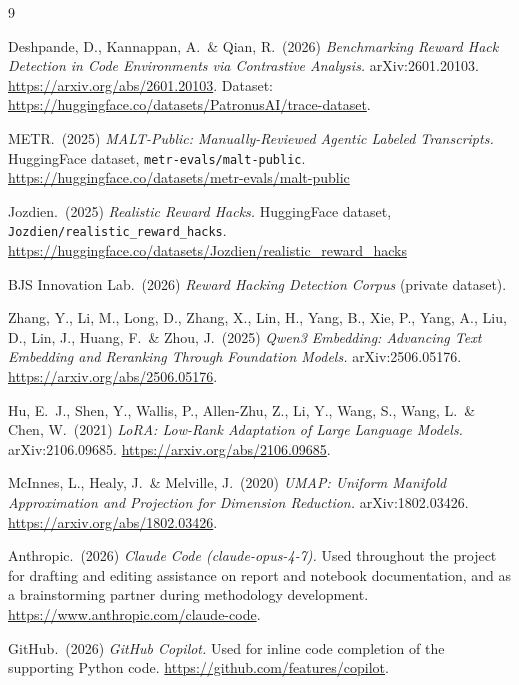\documentclass{article}
\begin{document}
\begin{thebibliography}{9}

Deshpande, D., Kannappan, A.\ \& Qian, R.\ (2026) {\it Benchmarking Reward Hack Detection in Code Environments via Contrastive Analysis.} arXiv:2601.20103. \url{https://arxiv.org/abs/2601.20103}. Dataset: \url{https://huggingface.co/datasets/PatronusAI/trace-dataset}.

METR.\ (2025) {\it MALT-Public: Manually-Reviewed Agentic Labeled Transcripts.} HuggingFace dataset, \texttt{metr-evals/malt-public}. \url{https://huggingface.co/datasets/metr-evals/malt-public}

Jozdien.\ (2025) {\it Realistic Reward Hacks.} HuggingFace dataset, \texttt{Jozdien/realistic\_reward\_hacks}. \url{https://huggingface.co/datasets/Jozdien/realistic_reward_hacks}

BJS Innovation Lab.\ (2026) {\it Reward Hacking Detection Corpus} (private dataset).

Zhang, Y., Li, M., Long, D., Zhang, X., Lin, H., Yang, B., Xie, P., Yang, A., Liu, D., Lin, J., Huang, F.\ \& Zhou, J.\ (2025) {\it Qwen3 Embedding: Advancing Text Embedding and Reranking Through Foundation Models.} arXiv:2506.05176. \url{https://arxiv.org/abs/2506.05176}.

Hu, E.\ J., Shen, Y., Wallis, P., Allen-Zhu, Z., Li, Y., Wang, S., Wang, L.\ \& Chen, W.\ (2021) {\it LoRA: Low-Rank Adaptation of Large Language Models.} arXiv:2106.09685. \url{https://arxiv.org/abs/2106.09685}.

McInnes, L., Healy, J.\ \& Melville, J.\ (2020) {\it UMAP: Uniform Manifold Approximation and Projection for Dimension Reduction.} arXiv:1802.03426. \url{https://arxiv.org/abs/1802.03426}.

Anthropic.\ (2026) {\it Claude Code (claude-opus-4-7).} Used throughout the project for drafting and editing assistance on report and notebook documentation, and as a brainstorming partner during methodology development. \url{https://www.anthropic.com/claude-code}.

GitHub.\ (2026) {\it GitHub Copilot.} Used for inline code completion of the supporting Python code. \url{https://github.com/features/copilot}.

\end{thebibliography}
\end{document}
